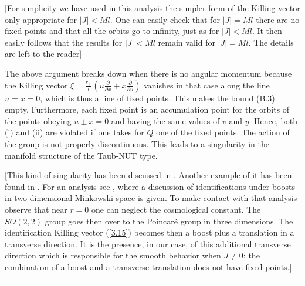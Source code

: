 \documentclass[12pt]{article}
\newcounter{c1} \newcounter{c2}
\newcommand{\p}{\partial}
\begin{document}
[For simplicity we have used in this analysis the simpler form
of the Killing vector only appropriate for $|J|<Ml$. One can
easily check that for $|J|=Ml$ there are no fixed points and
that all the orbits go to infinity, just as for $|J|<Ml$. It
then easily follows that the results for $|J|<Ml$ remain valid
for $|J|=Ml$. The details are left to the reader]

The above argument breaks down when there is no angular momentum
because the Killing vector $\xi =\frac{r_+}{l}(u\frac{\p}{\p x}
+x\frac{\p}{\p u})$ vanishes in that case along the line $u=x=0$, which
is thus a line of fixed points. This makes the bound (B.3)
empty. Furthermore, each fixed point is  an accumulation point for
the orbits of the points obeying $u\pm x =0$ and having the same
values of $v$ and $y$. Hence, both (i) and (ii) are violated if
one takes for $Q$ one of the fixed points. The action of the
group is not properly discontinuous. This leads to a singularity
in the manifold structure of the Taub-NUT type.

[This kind of singularity has been discussed in \cite{14}.
Another example of it has been found in \cite{15}. For an
analysis see \cite{9}, where a discussion of identifications
under boosts in two-dimensional Minkowski space is given. To
make contact with that analysis observe that near $r=0$ one can
neglect the cosmological constant. The $SO(2,2)$ group goes then
over to the Poincar\'e group in three dimensions. The
identification Killing vector (\ref{3.15}) becomes then a boost
plus a translation in a transverse direction. It is the presence,
in our case,  of this additional transverse direction which is
responsible for the smooth behavior when $J\neq 0$: the
combination of a boost and a transverse translation does not
have fixed points.]


\begin{center}
\rule{3cm}{.4mm}
\end{center}

\newpage
\end{document}
